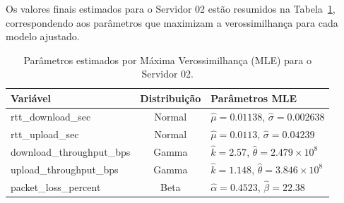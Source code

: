 \documentclass{article}
\begin{document}
Os valores finais estimados para o Servidor 02 estão resumidos na
Tabela~\ref{tab:mle_parameters_server02},
correspondendo aos parâmetros que maximizam a verossimilhança para cada modelo ajustado.

\begin{table}[H]
	\centering
	\caption{Parâmetros estimados por Máxima Verossimilhança (MLE) para o Servidor 02.}
	\label{tab:mle_parameters_server02}
	\begin{tabular}{|l|c|l|}
		\hline
		\textbf{Variável} & \textbf{Distribuição} & \textbf{Parâmetros MLE} \\
		\hline
		rtt\_download\_sec & Normal & $\hat{\mu}=0.01138$, $\hat{\sigma}=0.002638$ \\
		\hline
		rtt\_upload\_sec & Normal & $\hat{\mu}=0.0113$, $\hat{\sigma}=0.04239$ \\
		\hline
		download\_throughput\_bps & Gamma & $\hat{k}=2.57$, $\hat{\theta}=2.479 \times 10^8$ \\
		\hline
		upload\_throughput\_bps & Gamma & $\hat{k}=1.148$, $\hat{\theta}=3.846 \times 10^8$ \\
		\hline
		packet\_loss\_percent & Beta & $\hat{\alpha}=0.4523$, $\hat{\beta}=22.38$ \\
		\hline
	\end{tabular}
\end{table}
\end{document}
